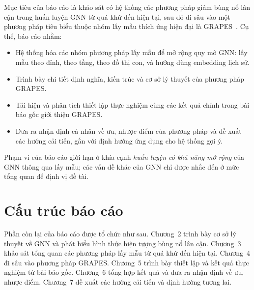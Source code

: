 Mục tiêu của báo cáo là khảo sát có hệ thống các phương pháp giảm bùng nổ lân cận trong huấn luyện GNN từ quá khứ đến hiện tại, sau đó đi sâu vào một phương pháp tiêu biểu thuộc nhóm lấy mẫu thích ứng hiện đại là GRAPES~\cite{Younesian2023GRAPES}. Cụ thể, báo cáo nhằm:
\begin{itemize}
    \item Hệ thống hóa các nhóm phương pháp lấy mẫu để mở rộng quy mô GNN: lấy mẫu theo đỉnh, theo tầng, theo đồ thị con, và hướng dùng embedding lịch sử.
    \item Trình bày chi tiết định nghĩa, kiến trúc và cơ sở lý thuyết của phương pháp GRAPES.
    \item Tái hiện và phân tích thiết lập thực nghiệm cùng các kết quả chính trong bài báo gốc giới thiệu GRAPES.
    \item Đưa ra nhận định cá nhân về ưu, nhược điểm của phương pháp và đề xuất các hướng cải tiến, gắn với định hướng ứng dụng cho hệ thống gợi ý.
\end{itemize}

Phạm vi của báo cáo giới hạn ở khía cạnh \textit{huấn luyện có khả năng mở rộng} của GNN thông qua lấy mẫu; các vấn đề khác của GNN chỉ được nhắc đến ở mức tổng quan để định vị đề tài.

\section{Cấu trúc báo cáo}

Phần còn lại của báo cáo được tổ chức như sau. Chương~2 trình bày cơ sở lý thuyết về GNN và phát biểu hình thức hiện tượng bùng nổ lân cận. Chương~3 khảo sát tổng quan các phương pháp lấy mẫu từ quá khứ đến hiện tại. Chương~4 đi sâu vào phương pháp GRAPES. Chương~5 trình bày thiết lập và kết quả thực nghiệm từ bài báo gốc. Chương~6 tổng hợp kết quả và đưa ra nhận định về ưu, nhược điểm. Chương~7 đề xuất các hướng cải tiến và định hướng tương lai.
